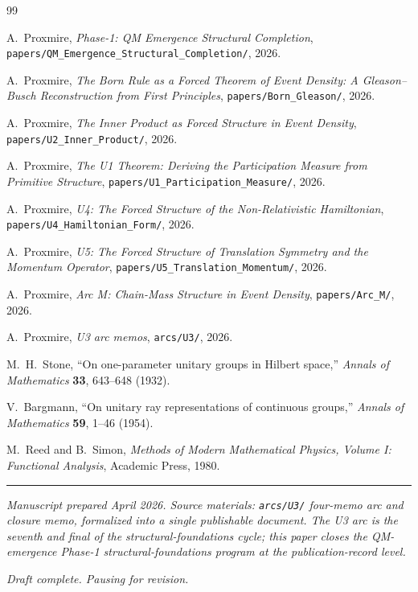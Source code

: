 \documentclass[11pt,a4paper]{article}
\begin{document}
\begin{thebibliography}{99}

A.~Proxmire, \emph{Phase-1: QM Emergence Structural Completion}, \texttt{papers/QM\_Emergence\_Structural\_Completion/}, 2026.

A.~Proxmire, \emph{The Born Rule as a Forced Theorem of Event Density: A Gleason--Busch Reconstruction from First Principles}, \texttt{papers/Born\_Gleason/}, 2026.

A.~Proxmire, \emph{The Inner Product as Forced Structure in Event Density}, \texttt{papers/U2\_Inner\_Product/}, 2026.

A.~Proxmire, \emph{The U1 Theorem: Deriving the Participation Measure from Primitive Structure}, \texttt{papers/U1\_Participation\_Measure/}, 2026.

A.~Proxmire, \emph{U4: The Forced Structure of the Non-Relativistic Hamiltonian}, \texttt{papers/U4\_Hamiltonian\_Form/}, 2026.

A.~Proxmire, \emph{U5: The Forced Structure of Translation Symmetry and the Momentum Operator}, \texttt{papers/U5\_Translation\_Momentum/}, 2026.

A.~Proxmire, \emph{Arc M: Chain-Mass Structure in Event Density}, \texttt{papers/Arc\_M/}, 2026.

A.~Proxmire, \emph{U3 arc memos}, \texttt{arcs/U3/}, 2026.

M.~H.~Stone, ``On one-parameter unitary groups in Hilbert space,'' \emph{Annals of Mathematics} \textbf{33}, 643--648 (1932).

V.~Bargmann, ``On unitary ray representations of continuous groups,'' \emph{Annals of Mathematics} \textbf{59}, 1--46 (1954).

M.~Reed and B.~Simon, \emph{Methods of Modern Mathematical Physics, Volume I: Functional Analysis}, Academic Press, 1980.

\end{thebibliography}

\vspace{1em}
\noindent\rule{\linewidth}{0.4pt}
\vspace{0.2em}

\noindent\emph{Manuscript prepared April 2026. Source materials: \texttt{arcs/U3/} four-memo arc and closure memo, formalized into a single publishable document. The U3 arc is the seventh and final of the structural-foundations cycle; this paper closes the QM-emergence Phase-1 structural-foundations program at the publication-record level.}

\noindent\emph{Draft complete. Pausing for revision.}
\end{document}
